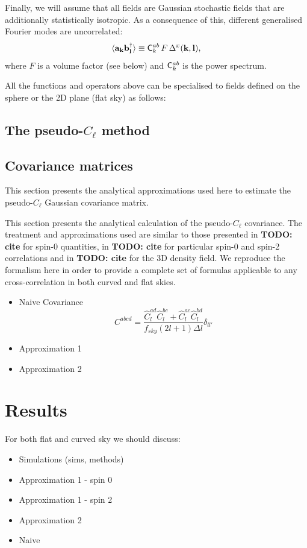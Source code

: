 \documentclass[useAMS,usenatbib]{mn2e}
\newcommand{\todo}[1]{{\bf TODO: #1}}
\newcommand{\pcl}[3]{\hat C_{#1}^{#2 #3}}
\begin{document}
    Finally, we will assume that all fields are Gaussian stochastic fields that are additionally statistically isotropic. As a consequence of this, different generalised Fourier modes are uncorrelated:
    \begin{equation}
      \langle {\bf a}_{\bf k}{\bf b}^\dag_{\bf l}\rangle\equiv {\sf C}^{ab}_k\,F\,\Delta^x({\bf k},{\bf l}),
    \end{equation}
    where $F$ is a volume factor (see below) and ${\sf C}^{ab}_k$ is the power spectrum.
    
    All the functions and operators above can be specialised to fields defined on the sphere or the 2D plane (flat sky) as follows:
    
  
  \subsection{The pseudo-$C_\ell$ method}
  
  \subsection{Covariance matrices}

This section presents the analytical approximations used here to estimate the pseudo-$C_\ell$ Gaussian covariance matrix.

This section presents the analytical calculation of the pseudo-$C_\ell$ covariance. The treatment and approximations used are similar to those presented in \todo{cite} for spin-0 quantities, in \todo{cite} for particular spin-0 and spin-2 correlations and in \todo{cite} for the 3D density field. We reproduce the formalism here in order to provide a complete set of formulas applicable to any cross-correlation in both curved and flat skies.



\begin{itemize}
\item Naive Covariance
  \begin{equation}
    C^{abcd} = \frac{\pcl{l}ad \pcl{l}bc + \pcl{l}ac \pcl{l}bd}{f_{sky} (2l +
      1) \Delta l} \delta_{ll'}
    \label{eq:naive}
  \end{equation}
\item Approximation 1
\item Approximation 2
\end{itemize}

\section{Results}
For both flat and curved sky we should discuss:
\begin{itemize}
\item Simulations (sims, methods)
\item Approximation 1 - spin 0
\item Approximation 1 - spin 2
\item Approximation 2
\item Naive
\end{itemize}
\end{document}
